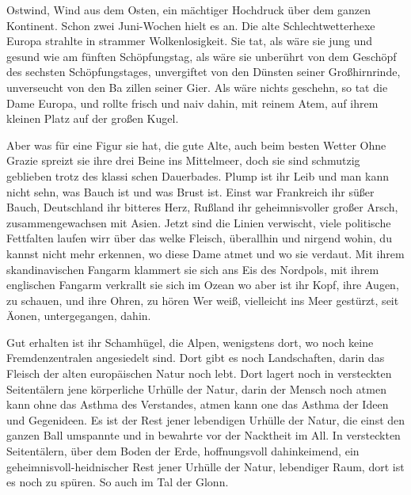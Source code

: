 

Ostwind, Wind aus dem Osten, ein mächtiger Hochdruck über
dem ganzen Kontinent. Schon zwei Juni-Wochen hielt es an.
Die alte Schlechtwetterhexe Europa strahlte in strammer
Wolkenlosigkeit. Sie tat, als wäre sie jung und ge\-sund wie
am fünften Schöpfungstag, als wäre sie unberührt von dem
Geschöpf des sechsten Schöpfungstages, unvergiftet von den
Dünsten seiner Großhirnrinde, unverseucht von den Ba\-%
zillen seiner Gier. Als wäre nichts geschehn, so tat die Dame
Europa, und rollte frisch und naiv dahin, mit reinem Atem,
auf ihrem kleinen Platz auf der großen Kugel.

Aber was für eine Figur sie hat, die gute Alte, auch beim
besten Wetter\ausr{} Ohne Grazie spreizt sie ihre drei Beine ins
Mittelmeer, doch sie sind schmutzig geblieben trotz des klassi\-%
schen Dauerbades. Plump ist ihr Leib und man kann nicht
sehn, was Bauch ist und was Brust ist. Einst war Frankreich
ihr süßer Bauch, Deutschland ihr bitteres Herz, Rußland ihr
geheimnisvoller großer Arsch, zusammengewachsen mit Asien.
Jetzt sind die Linien verwischt, viele politische Fettfalten
laufen wirr über das welke Fleisch, überallhin und nirgend\-%
wohin, du kannst nicht mehr erkennen, wo diese Dame atmet
und wo sie verdaut. Mit ihrem skandinavischen Fangarm
klammert sie sich ans Eis des Nordpols, mit ihrem englischen
Fangarm verkrallt sie sich im Ozean\dopp{} wo aber ist ihr Kopf,
ihre Augen, zu schauen, und ihre Ohren, zu hören\frag{} Wer
weiß,\eingriff{weiß, vielleicht ] weiß vielleicht}
vielleicht ins Meer gestürzt, seit Äonen, untergegangen,
dahin.

Gut erhalten ist ihr Schamhügel, die Alpen, wenigstens dort,
wo noch keine Fremdenzentralen angesiedelt sind. Dort gibt
es noch Landschaften, darin das Fleisch der alten europäischen
Natur noch lebt. Dort lagert noch in versteckten Seitentälern
jene körperliche Urhülle der Natur, darin der Mensch noch
atmen kann ohne das Asthma des Verstandes, atmen kann
one das Asthma der Ideen und Gegenideen. Es ist der Rest
jener lebendigen Urhülle der Natur, die einst den ganzen
Ball umspannte und in bewahrte vor der Nacktheit im All.
In versteckten Seitentälern, über dem Boden der Erde,
hoffnungsvoll dahinkeimend, ein geheimnisvoll-heidnischer
Rest jener Urhülle der Natur, lebendiger Raum, dort ist es
noch zu spüren. So auch im Tal der Glonn.

